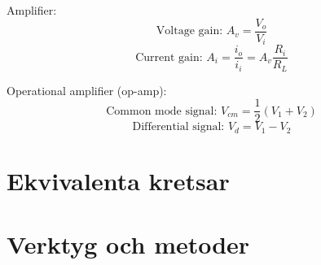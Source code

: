 \documentclass{article}
\begin{document}
Amplifier:
\[ \textrm{Voltage gain: } A_v = \frac{V_o}{V_i} \]
\[ \textrm{Current gain: } A_i = \frac{i_o}{i_i} = A_v \frac{R_i}{R_L} \]

Operational amplifier (op-amp):
\[ \textrm{Common mode signal: } V_{cm} = \frac{1}{2}(V_1 + V_2) \]
\[ \textrm{Differential signal: } V_d = V_1 - V_2 \]


\section{Ekvivalenta kretsar}


\section{Verktyg och metoder}

\end{document}
